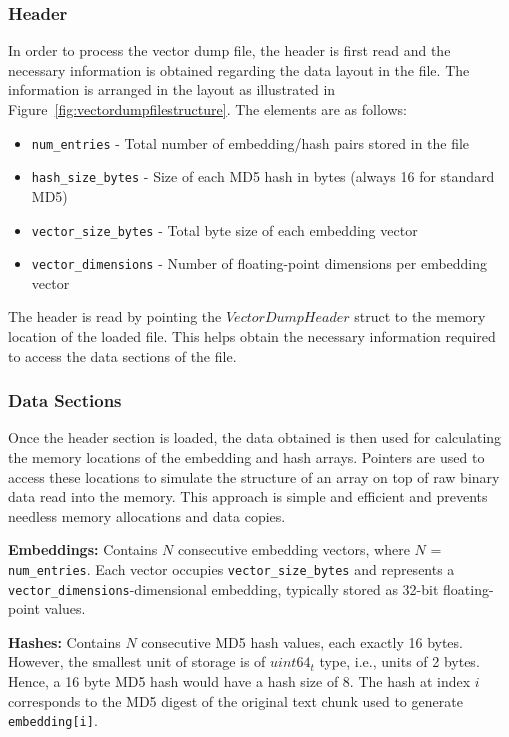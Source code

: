 \subsubsection{Header}
\label{subsec:Vectordump_Header}
In order to process the vector dump file, the header is first read and the necessary information is obtained regarding the data layout in the file. The information is arranged in the layout as illustrated in Figure~\ref{fig:vectordumpfilestructure}. The elements are as follows:
\begin{itemize}
    \item \texttt{num\_entries} - Total number of embedding/hash pairs stored in the file
    \item \texttt{hash\_size\_bytes} - Size of each MD5 hash in bytes (always 16 for standard MD5)
    \item \texttt{vector\_size\_bytes} - Total byte size of each embedding vector
    \item \texttt{vector\_dimensions} - Number of floating-point dimensions per embedding vector
\end{itemize}

The header is read by pointing the $VectorDumpHeader$ struct to the memory location of the loaded file. This helps obtain the  necessary information required to access the data sections of the file.

\subsubsection{Data Sections}
\label{subsec:Vectordump_DataSections}
Once the header section is loaded, the data obtained is then used for calculating the memory locations of the embedding and hash arrays.
Pointers are used to access these locations to simulate the structure of an array on top of raw binary data read into the memory. This approach is simple and efficient and prevents needless memory allocations and data copies.

\textbf{Embeddings:} Contains $N$ consecutive embedding vectors, where $N$ = \texttt{num\_entries}. Each vector occupies \texttt{vector\_size\_bytes} and represents a \texttt{vector\_dimensions}-dimensional embedding, typically stored as 32-bit floating-point values.

\textbf{Hashes:} Contains $N$ consecutive MD5 hash values, each exactly 16 bytes. However, the smallest unit of storage is of $uint64_t$ type, i.e., units of 2 bytes. Hence, a 16 byte MD5 hash would have a hash size of 8. The hash at index $i$ corresponds to the MD5 digest of the original text chunk used to generate \texttt{embedding[i]}.


